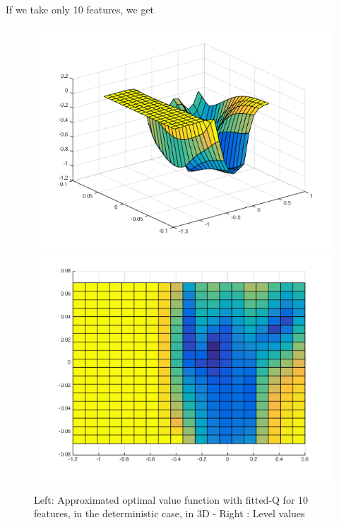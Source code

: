 \documentclass[a4paper, 12pt]{article}
\begin{document}
If we take only 10 features, we get
\begin{figure}[H]
	\centering
	\noindent\includegraphics[scale=0.3]{fittedQ-10feat-determ.png}
	\noindent\includegraphics[scale=0.3]{fittedQ-10feat-determ-flat.png}
	\caption{Left: Approximated optimal value function with fitted-Q for 10 features, in the deterministic case, in 3D - Right : Level values}
\end{figure}
\end{document}
